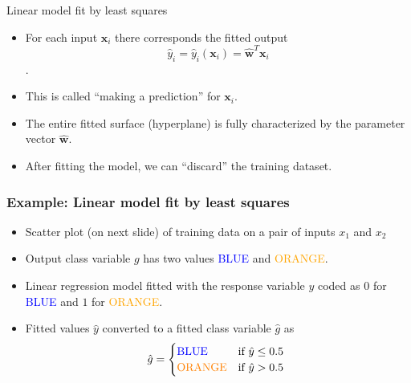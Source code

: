 \documentclass[notes]{beamer}          %
\newcommand{\vect}[1]{\bm{#1}}
\begin{document}
\begin{frame}{Linear model fit by least squares}
    \begin{itemize}
        \item For each input $\vect{x}_i$ there corresponds the fitted output $$\hat{y}_i = \hat{y}_i(\vect{x}_i) = \hat{\vect{w}}^T\vect{x}_i$$.
        \item This is called ``making a prediction'' for $\vect{x}_i$.

        \item The entire fitted surface (hyperplane) is fully characterized by the parameter vector $\hat{\vect{w}}$.

        \item After fitting the model, we can ``discard'' the training dataset.
    \end{itemize}
\end{frame}

\begin{frame}
\frametitle{Example: Linear model fit by least squares}
\begin{itemize}
    \item Scatter plot (on next slide) of training data on a pair of inputs $x_1$ and $x_2$
    \item Output class variable $g$ has two values \textcolor{blue}{BLUE} and \textcolor{orange}{ORANGE}.
    \item Linear regression model fitted with the response variable $y$ coded as $0$ for \textcolor{blue}{BLUE} and $1$ for \textcolor{orange}{ORANGE}.
    \item Fitted values $\hat{y}$ converted to a fitted class variable $\hat{g}$ as
    \[ \hat{g} = \begin{cases}
                    \text{\textcolor{blue}{BLUE}}  & \text{if $\hat{y} \leq 0.5$} \\
                    \text{\textcolor{orange}{ORANGE}} & \text{if $\hat{y} > 0.5$ }
                 \end{cases} \]

\end{itemize}
\end{frame}
\end{document}
